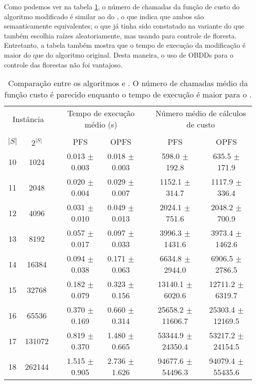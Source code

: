 Como podemos ver na tabela \ref{tab:opfs_vs_pfs}, o número de chamadas
da função de custo do algoritmo modificado é similar ao do 
, o que indica que ambos são semanticamente equivalentes; o 
que já tinha sido constatado na variante do  que também
escolhia raízes aleatoriamente, mas usando  para controle
de floresta. Entretanto, a tabela também mostra que o tempo de execução
da modificação é maior do que do algoritmo original. Desta maneira, o
uso de OBDDs para o controle das florestas não foi vantajoso.

\begin{table}
\centering
\footnotesize
\caption{Comparação entre os algoritmos  e . 
O número de chamadas médio da função custo é parecido enquanto o tempo
de execução é maior para o .}
\label{tab:opfs_vs_pfs}
\begin{tabular}{cc c cc c cc}
\toprule
\multicolumn{2}{c}{Instância} & \phantom{} & \multicolumn{2}{c}{Tempo de execução médio (s)}  & \phantom{} & \multicolumn{2}{c}{Número médio de cálculos de custo}\\
\cline{1-2}\cline{4-5}\cline{7-8}\\
$|S|$ & $2^{|S|}$ && PFS & OPFS && PFS & OPFS \\
10 &    1024 &&  0.013 $\pm$ 0.003 & 0.018 $\pm$ 0.003 &&  598.0 $\pm$ 192.8 & 635.5 $\pm$ 171.9 \\
11 &    2048 &&  0.020 $\pm$ 0.004 & 0.029 $\pm$ 0.007 &&  1152.1 $\pm$ 314.7 & 1117.9 $\pm$ 336.4 \\
12 &    4096 &&  0.031 $\pm$ 0.010 & 0.049 $\pm$ 0.013 &&  2024.1 $\pm$ 751.6 & 2048.2 $\pm$ 700.9 \\
13 &    8192 &&  0.057 $\pm$ 0.017 & 0.097 $\pm$ 0.033 &&  3996.3 $\pm$ 1431.6 & 3973.4 $\pm$ 1462.6 \\
14 &   16384 &&  0.094 $\pm$ 0.038 & 0.171 $\pm$ 0.063 &&  6634.8 $\pm$ 2944.0 & 6906.5 $\pm$ 2786.5 \\
15 &   32768 &&  0.182 $\pm$ 0.079 & 0.323 $\pm$ 0.156 &&  13140.1 $\pm$ 6020.6 & 12711.2 $\pm$ 6319.7 \\
16 &   65536 &&  0.370 $\pm$ 0.169 & 0.660 $\pm$ 0.314 &&  25658.2 $\pm$ 11606.7 & 25303.4 $\pm$ 12169.5 \\
17 &  131072 &&  0.819 $\pm$ 0.370 & 1.480 $\pm$ 0.665 &&  53344.9 $\pm$ 24350.4 & 53217.2 $\pm$ 24154.5 \\
18 &  262144 &&  1.515 $\pm$ 0.905 & 2.736 $\pm$ 1.626 &&  94677.6 $\pm$ 54496.3 & 94079.4 $\pm$ 55435.6 \\

\end{tabular}
\end{table}
